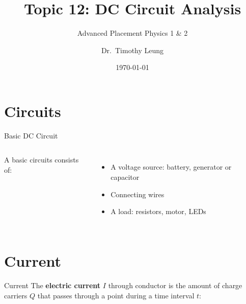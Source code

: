 \documentclass[12pt,aspectratio=169]{beamer}
\title{Topic 12: DC Circuit Analysis}
\subtitle{Advanced Placement Physics 1 \& 2}
\author[TML]{Dr.\ Timothy Leung}
\institute{Olympiads School, Toronto, ON, Canada}
\date{\today}
\newcommand{\eq}[2]{\vspace{#1}{\Large\begin{displaymath}#2\end{displaymath}}}
\begin{document}
\begin{frame}
  \maketitle
\end{frame}


\section{Circuits}

\begin{frame}{Basic DC Circuit}
  \begin{columns}
    \centering
    
    A basic circuits consists of:
    \begin{itemize}
    \item A voltage source: battery, generator or capacitor
    \item Connecting wires
    \item A load: resistors, motor, LEDs
    \end{itemize}
  \end{columns}
\end{frame}






\section{Current}

\begin{frame}{Current}
  The \textbf{electric current} $I$ through conductor is the amount of charge
  carriers $Q$ that passes through a point during a time interval $t$:

  \eq{-.25in}{
    \boxed{I=\frac{Q}{t}}
  }
%  
\end{frame}
\end{document}
